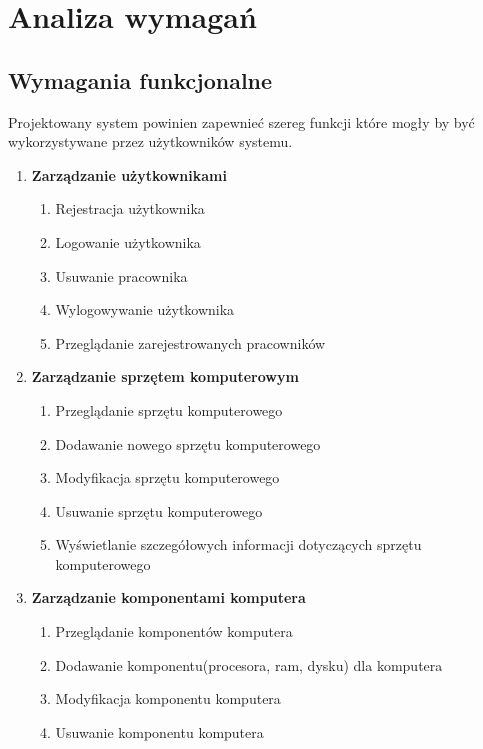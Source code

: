 \chapter{Analiza wymagań}

\section{Wymagania funkcjonalne}

Projektowany system powinien zapewnieć szereg funkcji które mogły by być wykorzystywane przez użytkowników systemu.


\begin{enumerate}[label={\textbf{FR}-\bfseries\arabic*}]
    \item \textbf{Zarządzanie użytkownikami}
    \begin{enumerate}[label={FR-\arabic{enumi}.\arabic*}]
        \item Rejestracja użytkownika
        \item Logowanie użytkownika
        \item Usuwanie pracownika
        \item Wylogowywanie użytkownika
				\item Przeglądanie zarejestrowanych pracowników
    \end{enumerate}
		
		\item \textbf{Zarządzanie sprzętem komputerowym}
    \begin{enumerate}[label={FR-\arabic{enumi}.\arabic*}]
        \item Przeglądanie sprzętu komputerowego
        \item Dodawanie nowego sprzętu komputerowego
        \item Modyfikacja sprzętu komputerowego
        \item Usuwanie sprzętu komputerowego
				\item Wyświetlanie szczegółowych informacji dotyczących sprzętu komputerowego
		\end{enumerate}
		
		\item \textbf{Zarządzanie komponentami komputera}
			\begin{enumerate}[label={FR-\arabic{enumi}.\arabic*}]		
				\item Przeglądanie komponentów komputera
				\item Dodawanie komponentu(procesora, ram, dysku) dla komputera
				\item Modyfikacja komponentu komputera
				\item Usuwanie komponentu komputera
    \end{enumerate}
		

\end{enumerate}
